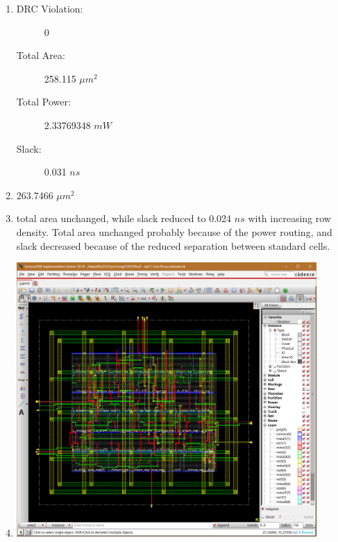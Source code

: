 \documentclass[12pt, a4paper]{article}
\begin{document}
\setcounter{section}{1}

\begin{enumerate}[label=\arabic*.]
    \item 
    \begin{description}
        \item[DRC Violation:] 0
        \item[Total Area:] 258.115 $\mu m^2$
        \item[Total Power:] 2.33769348 $mW$
        \item[Slack:] 0.031 $ns$
    \end{description}
    \item 263.7466 $\mu m^2$
    \item total area unchanged, while slack reduced to 0.024 $ns$ with increasing row density. 
    Total area unchanged probably because of the power routing, 
    and slack decreased because of the reduced separation between standard cells. 
    \item \includegraphics[width=0.9\textwidth]{figs/image.png}
\end{enumerate}
\end{document}
